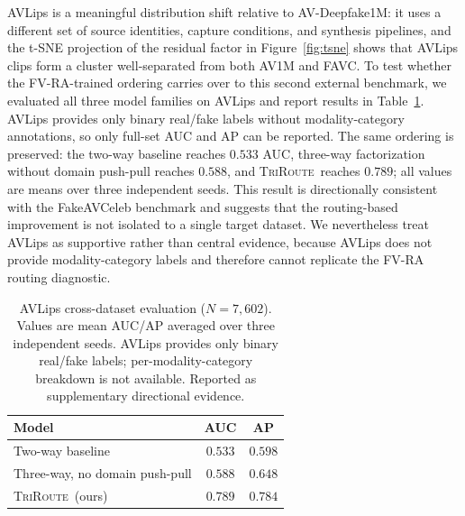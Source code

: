 \documentclass{article}
\newcommand{\method}{\textsc{TriRoute}}
\begin{document}
AVLips is a meaningful distribution shift relative to AV-Deepfake1M: it uses a different set of source identities, capture conditions, and synthesis pipelines, and the t-SNE projection of the residual factor in Figure~\ref{fig:tsne} shows that AVLips clips form a cluster well-separated from both AV1M and FAVC. To test whether the FV-RA-trained ordering carries over to this second external benchmark, we evaluated all three model families on AVLips \citep{shi2022avhubert} and report results in Table~\ref{tab:avlips}. AVLips provides only binary real/fake labels without modality-category annotations, so only full-set AUC and AP can be reported. The same ordering is preserved: the two-way baseline reaches $0.533$ AUC, three-way factorization without domain push-pull reaches $0.588$, and \method\ reaches $0.789$; all values are means over three independent seeds. This result is directionally consistent with the FakeAVCeleb benchmark and suggests that the routing-based improvement is not isolated to a single target dataset. We nevertheless treat AVLips as supportive rather than central evidence, because AVLips does not provide modality-category labels and therefore cannot replicate the FV-RA routing diagnostic.

\begin{table}[h]
    \centering
    \caption{AVLips cross-dataset evaluation ($N=7{,}602$). Values are mean AUC/AP averaged over three independent seeds. AVLips provides only binary real/fake labels; per-modality-category breakdown is not available. Reported as supplementary directional evidence.}
    \label{tab:avlips}
    \small
    \begin{tabular}{lcc}
        \toprule
        Model & AUC & AP \\
        \midrule
        Two-way baseline        & $0.533$ & $0.598$ \\
        Three-way, no domain push-pull & $0.588$ & $0.648$ \\
        \method\ (ours)         & $\mathbf{0.789}$ & $\mathbf{0.784}$ \\
        \bottomrule
    \end{tabular}
\end{table}
\end{document}

